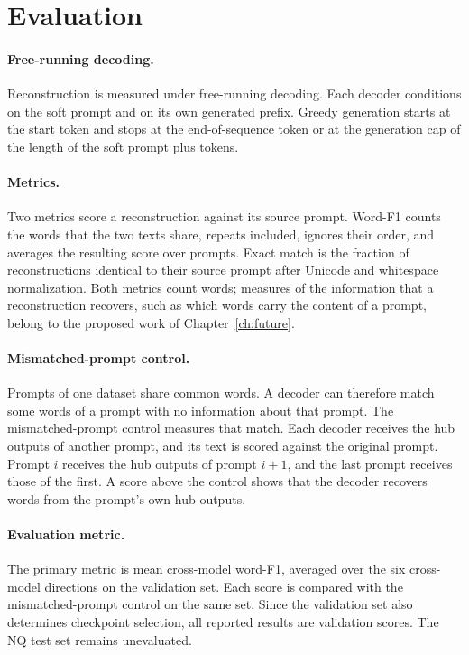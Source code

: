 \section{Evaluation}\label{sec:hub:eval}

\paragraph{Free-running decoding.} Reconstruction is measured under free-running decoding.
Each decoder conditions on the soft prompt and on its own generated prefix.
Greedy generation starts at the start token and stops at the end-of-sequence token or at the generation cap of the length of the soft prompt plus  tokens.

\paragraph{Metrics.} Two metrics score a reconstruction against its source prompt.
Word-F1 counts the words that the two texts share, repeats included, ignores their order, and averages the resulting score over prompts.
Exact match is the fraction of reconstructions identical to their source prompt after Unicode and whitespace normalization.
Both metrics count words; measures of the information that a reconstruction recovers, such as which words carry the content of a prompt, belong to the proposed work of Chapter~\ref{ch:future}.

\paragraph{Mismatched-prompt control.} Prompts of one dataset share common words.
A decoder can therefore match some words of a prompt with no information about that prompt.
The mismatched-prompt control measures that match.
Each decoder receives the hub outputs of another prompt, and its text is scored against the original prompt.
Prompt $i$ receives the hub outputs of prompt $i+1$, and the last prompt receives those of the first.
A score above the control shows that the decoder recovers words from the prompt's own hub outputs.

\paragraph{Evaluation metric.}
The primary metric is mean cross-model word-F1, averaged over the six cross-model directions on the validation set.
Each score is compared with the mismatched-prompt control on the same set.
Since the validation set also determines checkpoint selection, all reported results are validation scores.
The NQ test set remains unevaluated.

